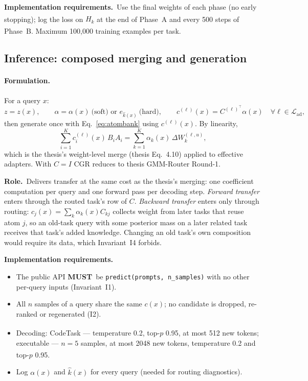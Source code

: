 \documentclass[11pt]{article}
\newcommand{\T}{^{\top}}
\newcommand{\tagthesis}{\textsuperscript{\textcolor{teal!70!black}{\sffamily[thesis]}}}
\newcommand{\tagnew}{\textsuperscript{\textcolor{orange!80!black}{\sffamily[new]}}}
\newcommand{\tagassumed}{\textsuperscript{\textcolor{red!70!black}{\sffamily[assumed]}}}
\newcommand{\MUST}{\textbf{MUST}}
\newcommand{\Ladapt}{\mathcal{L}_{\mathrm{ad}}}
\newcommand{\role}{\par\noindent\textbf{Role.}\ }
\newcommand{\impl}{\par\noindent\textbf{Implementation requirements.}\ }
\begin{document}
\impl Use the final weights of each phase (no early stopping)\tagnew; log the loss on $H_k$ at the end of
Phase~A and every 500 steps of Phase~B. Maximum 100{,}000 training examples per task\tagthesis.

\subsection{Inference: composed merging and generation}\label{sec:infer}

\paragraph{Formulation.} For a query $x$:
\begin{equation}
  z=z(x),\qquad \alpha=\alpha(x)\ \text{(soft) or } e_{\hat k(x)}\ \text{(hard)},\qquad
  c^{(\ell)}(x)=C^{(\ell)\T}\alpha(x)\quad\forall\ell\in\Ladapt,
\end{equation}
then generate once with Eq.~\eqref{eq:atombank} using $c^{(\ell)}(x)$. By linearity,
\begin{equation}
  \sum_{i=1}^{K}c^{(\ell)}_i(x)\,B_iA_i=\sum_{k=1}^{K}\alpha_k(x)\,\Delta W_k^{(\ell,u)},
\end{equation}
which is the thesis's weight-level merge (thesis Eq.~4.10) applied to effective adapters. With $C=I$ CGR reduces
to thesis GMM-Router Round-1.

\role Delivers transfer at the same cost as the thesis's merging: one coefficient computation per query and one
forward pass per decoding step.
\emph{Forward transfer} enters through the routed task's row of $C$.
\emph{Backward transfer} enters only through routing: $c_j(x)=\sum_k\alpha_k(x)C_{kj}$ collects weight from later
tasks that reuse atom $j$, so an old-task query with some posterior mass on a later related task receives that
task's added knowledge. Changing an old task's own composition would require its data, which Invariant~I4 forbids.

\impl
\begin{itemize}[leftmargin=*]
  \item The public API \MUST\ be \texttt{predict(prompts, n\_samples)} with no other per-query inputs (Invariant~I1).
  \item All $n$ samples of a query share the same $c(x)$; no candidate is dropped, re-ranked or regenerated (I2).
  \item Decoding\tagthesis: CodeTask --- temperature 0.2, top-$p$ 0.95, at most 512 new tokens;
        executable --- $n=5$ samples, at most 2048 new tokens, temperature 0.2 and top-$p$ 0.95\tagassumed.
  \item Log $\alpha(x)$ and $\hat k(x)$ for every query (needed for routing diagnostics).
\end{itemize}
\end{document}
